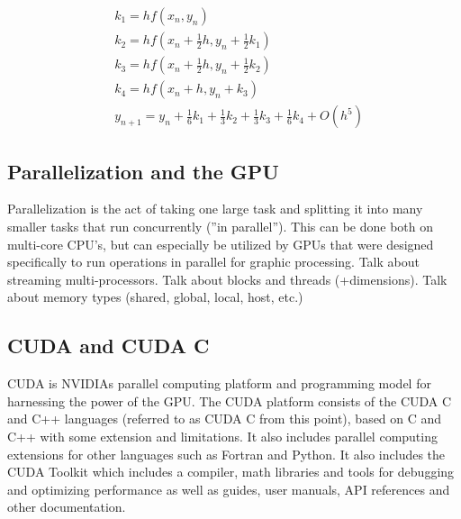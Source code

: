 \begin{equation}\begin{aligned}\label{eq:rk4}
&k_1 = h f(x_n, y_n)\\
&k_2 = h f(x_n + \frac{1}{2}h, y_n + \frac{1}{2}k_1)\\
&k_3 = h f(x_n + \frac{1}{2}h, y_n + \frac{1}{2}k_2)\\
&k_4 = h f(x_n + h, y_n + k_3)\\
&y_{n+1} = y_n + \frac{1}{6}k_1 + \frac{1}{3}k_2 + \frac{1}{3}k_3 + \frac{1}{6}k_4 + O(h^5)
\end{aligned}\end{equation}

\subsection{Parallelization and the GPU}
Parallelization is the act of taking one large task and splitting it into many smaller tasks that run concurrently (''in parallel''). This can be done both on multi-core CPU's, but can especially be utilized by GPUs that were designed specifically to run operations in parallel for graphic processing.
Talk about streaming multi-processors. Talk about blocks and threads (+dimensions).
Talk about memory types (shared, global, local, host, etc.)


\subsection{CUDA and CUDA C}
CUDA is NVIDIAs parallel computing platform and programming model for harnessing the power of the GPU.
The CUDA platform consists of the CUDA C and C++ languages (referred to as CUDA C from this point), based on C and C++ with some extension and limitations. It also includes parallel computing extensions for other languages such as Fortran and Python. It also includes the CUDA Toolkit which includes a compiler, math libraries and tools for debugging and optimizing performance as well as guides, user manuals, API references and other documentation.

